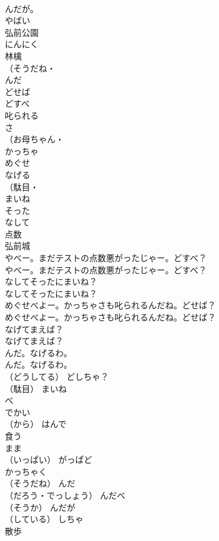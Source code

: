 \documentclass[8pt]{extreport}
\begin{document}
\begin{CJK}{UTF8}{min}
\\	んだが。 
\\	やばい
\\	弘前公園
\\	にんにく
\\	林檎
\\	（そうだね・
\\	んだ
\\	どせば
\\	どすべ
\\	叱られる
\\	さ
\\	（お母ちゃん・
\\	かっちゃ
\\	めぐせ
\\	なげる
\\	（駄目・
\\	まいね
\\	そった
\\	なして
\\	点数
\\	弘前城
\\	やべー。まだテストの点数悪がったじゃー。どすべ？	
\\	やべー。まだテストの点数悪がったじゃー。どすべ？ 
\\	なしてそったにまいね？	
\\	なしてそったにまいね？ 
\\	めぐせべよー。かっちゃさも叱られるんだね。どせば？	
\\	めぐせべよー。かっちゃさも叱られるんだね。どせば？ 
\\	なげてまえば？	
\\	なげてまえば？ 
\\	んだ。なげるわ。	
\\	んだ。なげるわ。 
\\	（どうしてる）	どしちゃ？
\\	（駄目）	まいね
\\	べ
\\	でかい
\\	（から）	はんで
\\	食う
\\	まま
\\	（いっぱい）	がっぱど
\\	かっちゃく
\\	（そうだね）	んだ
\\	（だろう・でっしょう）	んだべ
\\	（そうか）	んだが
\\	（している）	しちゃ
\\	散歩

\end{CJK}
\end{document}
